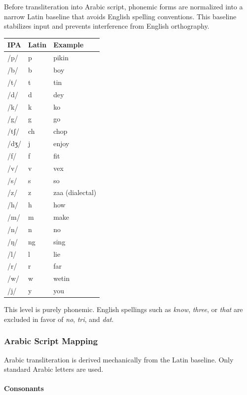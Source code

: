 \documentclass[12pt]{article}
\begin{document}
Before transliteration into Arabic script, phonemic forms are normalized into a narrow Latin baseline that avoids English spelling conventions. This baseline stabilizes input and prevents interference from English orthography.

\begin{center}
\begin{tabular}{lll}
IPA & Latin & Example \\
\hline
/p/ & p & pikin \\
/b/ & b & boy \\
/t/ & t & tin \\
/d/ & d & dey \\
/k/ & k & ko \\
/g/ & g & go \\
/tʃ/ & ch & chop \\
/dʒ/ & j & enjoy \\
/f/ & f & fit \\
/v/ & v & vex \\
/s/ & s & so \\
/z/ & z & zaa (dialectal) \\
/h/ & h & how \\
/m/ & m & make \\
/n/ & n & no \\
/ŋ/ & ng & sing \\
/l/ & l & lie \\
/r/ & r & far \\
/w/ & w & wetin \\
/j/ & y & you \\
\end{tabular}
\end{center}

This level is purely phonemic. English spellings such as \textit{know}, \textit{three}, or \textit{that} are excluded in favor of \textit{no}, \textit{tri}, and \textit{dat}.

\subsubsection{Arabic Script Mapping}

Arabic transliteration is derived mechanically from the Latin baseline. Only standard Arabic letters are used.

\paragraph{Consonants}
\end{document}
